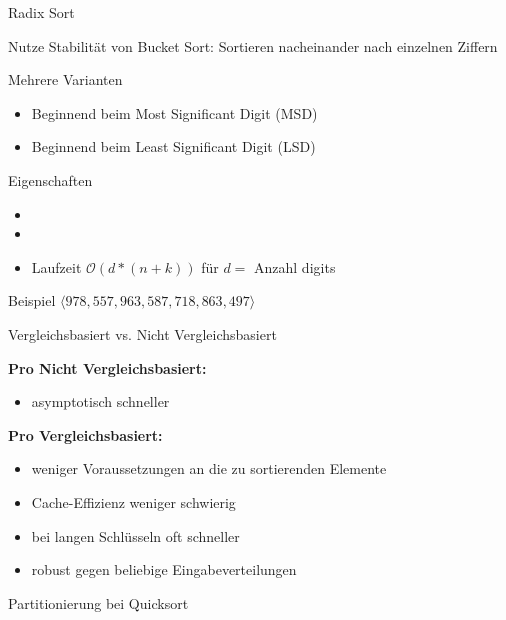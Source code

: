 \begin{frame}{Radix Sort}

	Nutze Stabilität von Bucket Sort: Sortieren nacheinander nach einzelnen Ziffern

	\begin{block}{Mehrere Varianten}
	\begin{itemize}
		\item Beginnend beim Most Significant Digit (MSD)
		\item Beginnend beim Least Significant Digit (LSD)
	\end{itemize}
	\end{block}

	\begin{block}{Eigenschaften}
		\begin{itemize}
			\item {\color{english}{stabil}}
			\item {\color{red}{nicht inplace}}
			\item Laufzeit $\mathcal{O}(d * (n + k))$ für $d =$ Anzahl digits
		\end{itemize}
	\end{block}

	\begin{block}{Beispiel}
		$\langle 978, 557, 963, 587, 718, 863, 497 \rangle $
	\end{block}
\end{frame}

\begin{frame}{Vergleichsbasiert vs. Nicht Vergleichsbasiert}

	{\textbf{\large{Pro Nicht Vergleichsbasiert:}}}
	\begin{itemize}
		\item asymptotisch schneller
	\end{itemize}


	{\textbf{\large{Pro Vergleichsbasiert:}}} \\
	\begin{itemize}
		\item weniger Voraussetzungen an die zu sortierenden Elemente
		\item Cache-Effizienz weniger schwierig
		\item bei langen Schlüsseln oft schneller
		\item robust gegen beliebige Eingabeverteilungen
	\end{itemize}

\end{frame}
\begin{frame}
	\begin{center}
		\Huge
		Partitionierung bei Quicksort
	\end{center}
\end{frame}

